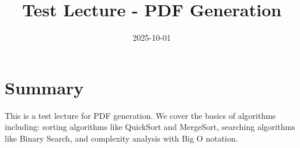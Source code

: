 \documentclass[11pt]{article}
\begin{document}
\title{Test Lecture - PDF Generation}
\date{2025-10-01}
\maketitle

\section{Summary}
This is a test lecture for PDF generation. We cover the basics of algorithms including: sorting algorithms like QuickSort and MergeSort, searching algorithms like Binary Search, and complexity analysis with Big O notation.
\end{document}
